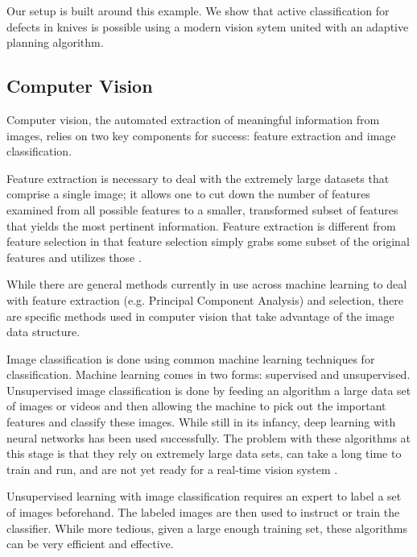 \documentclass[letterpaper, 10 pt, conference]{ieeeconf}  %
\begin{document}
Our setup is built around this example. We show that active classification for defects in knives is possible using a modern vision sytem united with an adaptive planning algorithm.

\subsection{Computer Vision}

Computer vision, the automated extraction of meaningful information from images, relies on two key components for success: feature extraction and image classification. 

Feature extraction is necessary to deal with the extremely large datasets that comprise a single image; it allows one to cut down the number of features examined from all possible features to a smaller, transformed subset of features that yields the most pertinent information. Feature extraction is different from feature selection in that feature selection simply grabs some subset of the original features and utilizes those \cite{featSelExt}.

While there are general methods currently in use across machine learning to deal with feature extraction (e.g. Principal Component Analysis) and selection, there are specific methods used in computer vision that take advantage of the image data structure.

Image classification is done using common machine learning techniques for classification. Machine learning comes in two forms: supervised and unsupervised. Unsupervised image classification is done by feeding an algorithm a large data set of images or videos and then allowing the machine to pick out the important features and classify these images. While still in its infancy, deep learning with neural networks has been used successfully. The problem with these algorithms at this stage is that they rely on extremely large data sets, can take a long time to train and run, and are not yet ready for a real-time vision system \cite{deepLearning1}. 

Unsupervised learning with image classification requires an expert to label a set of images beforehand. The labeled images are then used to instruct or train the classifier. While more tedious, given a large enough training set, these algorithms can be very efficient and effective.
\end{document}
